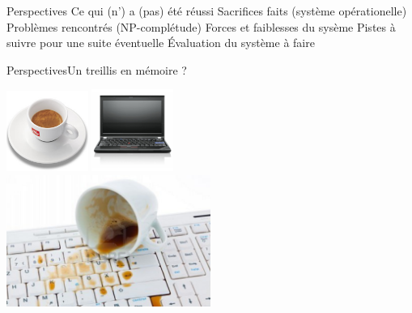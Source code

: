 \begin{frame}{Perspectives}
Ce qui (n') a (pas) été réussi
Sacrifices faits (système opérationelle)
Problèmes rencontrés (NP-complétude)
Forces et faiblesses du sysème
Pistes à suivre pour une suite éventuelle
Évaluation du système à faire
\end{frame}

\begin{frame}{Perspectives}{Un treillis en mémoire ?}
\begin{center}
\includegraphics[width=0.2\textwidth]{img/conclusion/espresso}
\includegraphics[width=0.2\textwidth]{img/conclusion/ordi} \\
\includegraphics[width=0.5\textwidth]{img/conclusion/cafe_renverse}
\end{center}
\end{frame}